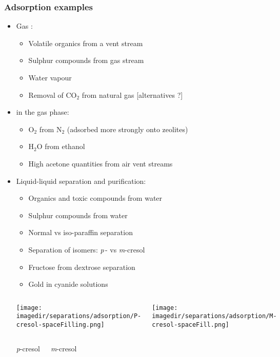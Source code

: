 \begin{frame}\frametitle{Adsorption examples}
	\begin{itemize}
		\item	Gas {\color{purple}{purification}}:
		\begin{itemize}
			\item	Volatile organics from a vent stream
			\item	Sulphur compounds from gas stream
			\item	Water vapour
			\item	Removal of $\text{CO}_2$ from natural gas [alternatives ?]
		\end{itemize}
		\item	{\color{purple}{Bulk separation}} in the gas phase:
		\begin{itemize}
			\item	$\text{O}_2$ from $\text{N}_2$ (adsorbed more strongly onto zeolites)
			\item	$\text{H}_2\text{O}$ from ethanol
			\item	High acetone quantities from air vent streams
		\end{itemize}
		\item	Liquid-liquid separation and purification:
		\begin{itemize}
			\item	Organics and toxic compounds from water
			\item	Sulphur compounds from water
			\item	Normal vs iso-paraffin separation
			\item	Separation of isomers: \emph{p}$\,$- vs \emph{m}-cresol
			\item	Fructose from dextrose separation
			\item	Gold in cyanide solutions
		\end{itemize}
		\vspace{-2.5cm}
		\begin{columns}[t]
				\begin{center}
					\texttt{[image: \\imagedir/separations/adsorption/P-cresol-spaceFilling.png]}
				\end{center}
				\begin{center}
					\texttt{[image: \\imagedir/separations/adsorption/M-cresol-spaceFill.png]}
				\end{center}
		\end{columns}
		\begin{columns}[t]
				\begin{center}
					\emph{p}-cresol
				\end{center}
				\begin{center}
					\emph{m}-cresol
				\end{center}
		\end{columns}
		\hfill{}

	\end{itemize}
\end{frame}

